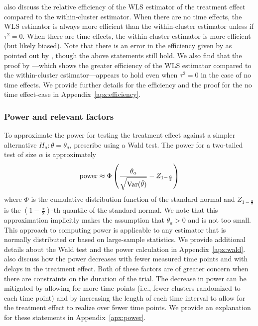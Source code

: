 \documentclass[10pt]{article}
\begin{document}
\citeauthor{Hussey:2007} also discuss the relative efficiency of the WLS estimator of the treatment effect compared to the within-cluster estimator. When there are no time effects, the WLS estimator is always more efficient than the within-cluster estimator unless if $\tau^2=0$. When there are time effects, the within-cluster estimator is more efficient (but likely biased). Note that there is an error in the efficiency given by \textcite{Hussey:2007} as pointed out by \textcite{Liao:2015}, though the above statements still hold. We also find that the proof by \textcite{Liao:2015}---which shows the greater efficiency of the WLS estimator compared to the within-cluster estimator---appears to hold even when $\tau^2=0$ in the case of no time effects. We provide further details for the efficiency and the proof for the no time effect-case in Appendix~\ref{apx:efficiency}.

\subsubsection{Power and relevant factors}

To approximate the power for testing the treatment effect against a simpler alternative $H_a: \theta=\theta_a$, \textcite{Hussey:2007} prescribe using a Wald test. The power for a two-tailed test of size $\alpha$ is approximately
\[
\text{power} \approx \Phi\left(\frac{\theta_a}{\sqrt{\mathrm{Var}(\hat{\theta})}} - Z_{1-\frac{\alpha}{2}}\right)
\]
where $\Phi$ is the cumulative distribution function of the standard normal and $Z_{1-\frac{\alpha}{2}}$ is the $\left(1-\frac{\alpha}{2}\right)$-th quantile of the standard normal. We note that this approximation implicitly makes the assumption that $\theta_a>0$ and is not too small. This approach to computing power is applicable to any estimator that is normally distributed or based on large-sample statistics. We provide additional details about the Wald test and the power calculation in Appendix~\ref{apx:wald}.
\\

\textcite{Hussey:2007} also discuss how the power decreases with fewer measured time points and with delays in the treatment effect. Both of these factors are of greater concern when there are constraints on the duration of the trial. The decrease in power can be mitigated by allowing for more time points (i.e., fewer clusters randomized to each time point) and by increasing the length of each time interval to allow for the treatment effect to realize over fewer time points. We provide an explanation for these statements in Appendix~\ref{apx:power}.
\end{document}
